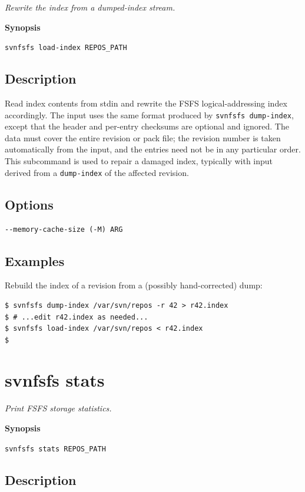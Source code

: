 \emph{Rewrite the index from a dumped-index stream.}

\textbf{Synopsis}

\texttt{svnfsfs\ load-index\ REPOS\_PATH}

\subsection{Description}

Read index contents from stdin and rewrite the FSFS logical-addressing
index accordingly. The input uses the same format produced by
\texttt{svnfsfs\ dump-index}, except that the header and per-entry
checksums are optional and ignored. The data must cover the entire
revision or pack file; the revision number is taken automatically from
the input, and the entries need not be in any particular order. This
subcommand is used to repair a damaged index, typically with input
derived from a \texttt{dump-index} of the affected revision.

\subsection{Options}

\begin{verbatim}
--memory-cache-size (-M) ARG
\end{verbatim}

\subsection{Examples}

Rebuild the index of a revision from a (possibly hand-corrected) dump:

\begin{verbatim}
$ svnfsfs dump-index /var/svn/repos -r 42 > r42.index
$ # ...edit r42.index as needed...
$ svnfsfs load-index /var/svn/repos < r42.index
$
\end{verbatim}

\section{svnfsfs stats}\label{svn.ref.svnfsfs.c.stats}

\emph{Print FSFS storage statistics.}

\textbf{Synopsis}

\texttt{svnfsfs\ stats\ REPOS\_PATH}

\subsection{Description}

